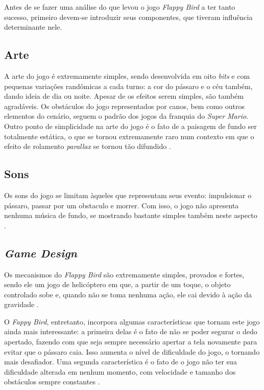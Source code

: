 Antes de se fazer uma análise do que levou o jogo \textit{Flappy Bird} a ter tanto sucesso, primeiro devem-se introduzir seus componentes, que tiveram influência determinante nele.

\subsection{Arte}
A arte do jogo é extremamente simples, sendo desenvolvida em oito \textit{bits} e com pequenas variações randômicas a cada turno: a cor do pássaro e o céu também, dando ideia de dia ou noite. Apesar de os efeitos serem simples, são também agradáveis. Os obstáculos do jogo representados por canos, bem como outros elementos do cenário, seguem o padrão dos jogos da franquia do \textit{Super Mario}. Outro ponto de simplicidade na arte do jogo é o fato de a paisagem de fundo ser totalmente estática, o que se tornou extremamente raro num contexto em que o efeito de rolamento \textit{parallax} se tornou tão difundido \cite{Eldic2014}.

\subsection{Sons}
Os sons do jogo se limitam àqueles que representam seus evento: impulsionar o pássaro, passar por um obstaculo e morrer. Com isso, o jogo não apresenta nenhuma música de fundo, se mostrando bastante simples também neste aspecto \cite{Eldic2014}.

\subsection{\textit{Game Design}}
Os mecanismos do \textit{Flappy Bird} são extremamente simples, provados e fortes, sendo ele um jogo de helicóptero em que, a partir de um toque, o objeto controlado sobe e, quando não se toma nenhuma ação, ele cai devido à ação da gravidade \cite{Eldic2014}.

O \textit{Fappy Bird}, entretanto, incorpora algumas características que tornam este jogo ainda mais interessante: a primeira delas é o fato de não se poder segurar o dedo apertado, fazendo com que seja sempre necessário apertar a tela novamente para evitar que o pássaro caia. Isso aumenta o nível de dificuldade do jogo, o tornando mais desafiador. Uma segunda característica é o fato de o jogo não ter sua dificuldade alterada em nenhum momento, com velocidade e tamanho dos obstáculos sempre constantes \cite{Eldic2014}.

